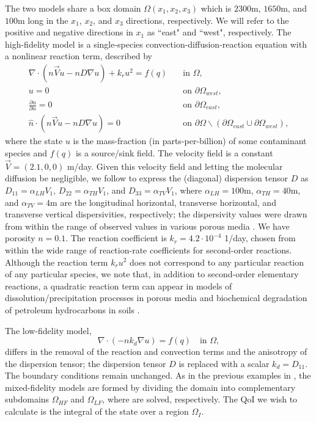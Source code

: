 \documentclass[review,sort&compress]{elsarticle}
\begin{document}
The two models share a box domain $\Omega(x_1,x_2,x_3)$ which is $2300$m, $1650$m, and $100$m long in the $x_1$, $x_2$, and $x_3$ directions, respectively. We will refer to the positive and negative directions in $x_1$ as ``east" and ``west", respectively. The high-fidelity model is a single-species convection-diffusion-reaction equation with a nonlinear reaction term, described by
%
\begin{subequations}
\label{eq:cdvcdrHF3D}
\begin{align}
\nabla\cdot(n\vec{V}u - nD\nabla u) + k_ru^2 = f(q) \quad &\text{in } \Omega, \label{eq:HFeq3D}\\
u = 0 \quad &\text{on } \partial \Omega_{west}, \\
\frac{\partial u}{\partial n} = 0 \quad &\text{on }\partial\Omega_{east}, \\
\hat{n}\cdot(n\vec{V}u - nD\nabla u) = 0 \quad &\text{on }\partial\Omega\backslash(\partial\Omega_{east}\cup\partial\Omega_{west}),
\end{align}
\end{subequations}
%
where the state $u$ is the mass-fraction (in parts-per-billion) of some contaminant species and $f(q)$ is a source/sink field. The velocity field is a constant $\vec{V}=(2.1,0,0)$ m/day. Given this velocity field and letting the molecular diffusion be negligible, we follow \cite{Vestedetal93} to express the (diagonal) dispersion tensor $D$ as $D_{11}=\alpha_{LH}V_1$, $D_{22}=\alpha_{TH}V_1$, and $D_{33}=\alpha_{TV}V_1$, where $\alpha_{LH}=100$m, $\alpha_{TH}=40$m, and $\alpha_{TV}=4$m are the longitudinal horizontal, transverse horizontal, and transverse vertical dispersivities, respectively; the dispersivity values were drawn from within the range of observed values in various porous media \cite{Davis86}. We have porosity $n=0.1$. The reaction coefficient is $k_r=4.2\cdot10^{-4}$ 1/day, chosen from within the wide range of reaction-rate coefficients for second-order reactions. Although the reaction term $k_ru^2$ does not correspond to any particular reaction of any particular species, we note that, in addition to second-order elementary reactions, a quadratic reaction term can appear in models of dissolution/precipitation processes in porous media \cite{Aha97} and biochemical degradation of petroleum hydrocarbons in soils \cite{Jack94}.

The low-fidelity model,
%
\begin{equation}
\nabla\cdot(- nk_d\nabla u) = f(q) \quad \text{in } \Omega, \label{eq:LFeq3D}
\end{equation}
%
differs in the removal of the reaction and convection terms and the anisotropy of the dispersion tensor; the dispersion tensor $D$ is replaced with a scalar $k_d=D_{11}$. The boundary conditions remain unchanged. As in the previous examples in , the mixed-fidelity models are formed by dividing the domain into complementary subdomains $\Omega_{HF}$ and $\Omega_{LF}$, where  are solved, respectively. The QoI we wish to calculate is the integral of the state over a region $\Omega_I$.
\end{document}
